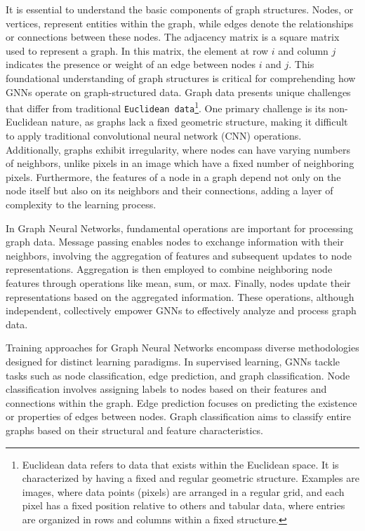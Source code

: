 It is essential to understand the basic components of graph structures. Nodes, or vertices, represent entities within the graph, while edges denote the relationships or connections between these nodes. The adjacency matrix is a square matrix used to represent a graph. In this matrix, the element at row $i$ and column $j$ indicates the presence or weight of an edge between nodes $i$ and $j$. This foundational understanding of graph structures is critical for comprehending how GNNs operate on graph-structured data.
Graph data presents unique challenges that differ from traditional \verb+Euclidean data+\footnote{
Euclidean data refers to data that exists within the Euclidean space. It is characterized by having a fixed and regular geometric structure. Examples are images, where data points (pixels) are arranged in a regular grid, and each pixel has a fixed position relative to others and tabular data, where entries are organized in rows and columns within a fixed structure.
}. One primary challenge is its non-Euclidean nature, as graphs lack a fixed geometric structure, making it difficult to apply traditional convolutional neural network (CNN) operations. Additionally, graphs exhibit irregularity, where nodes can have varying numbers of neighbors, unlike pixels in an image which have a fixed number of neighboring pixels. Furthermore, the features of a node in a graph depend not only on the node itself but also on its neighbors and their connections, adding a layer of complexity to the learning process.

In Graph Neural Networks, fundamental operations are important for processing graph data. Message passing enables nodes to exchange information with their neighbors, involving the aggregation of features and subsequent updates to node representations. Aggregation is then employed to combine neighboring node features through operations like mean, sum, or max. Finally, nodes update their representations based on the aggregated information. These operations, although independent, collectively empower GNNs to effectively analyze and process graph data.

Training approaches for Graph Neural Networks encompass diverse methodologies designed for distinct learning paradigms. \cite{DBLP:journals/corr/abs-1812-08434} In supervised learning, GNNs tackle tasks such as node classification, edge prediction, and graph classification. Node classification involves assigning labels to nodes based on their features and connections within the graph. Edge prediction focuses on predicting the existence or properties of edges between nodes. Graph classification aims to classify entire graphs based on their structural and feature characteristics.

